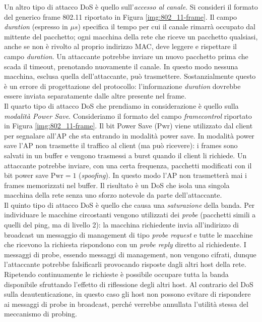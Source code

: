 Un altro tipo di attacco DoS è quello sull'\textit{accesso al canale}. Si consideri il formato del generico frame 802.11 riportato in Figura \ref{img:802_11-frame}. Il campo \textit{duration} (espresso in $\mu s$) specifica il tempo per cui il canale rimarrà occupato dal mittente del pacchetto; ogni macchina della rete che riceve un pacchetto qualsiasi, anche se non è rivolto al proprio indirizzo MAC, deve leggere e rispettare il campo \textit{duration}. Un attaccante potrebbe inviare un nuovo pacchetto prima che scada il timeout, prenotando nuovamente il canale. In questo modo nessuna macchina, esclusa quella dell'attaccante, può trasmettere. Sostanzialmente questo è un errore di progettazione del protocollo: l'informazione \textit{duration} dovrebbe essere inviata separatamente dalle altre presente nel frame.\\
Il quarto tipo di attacco DoS che prendiamo in considerazione è quello sulla \textit{modalità Power Save}. Consideriamo il formato del campo \textit{framecontrol} riportato in Figura \ref{img:802_11-frame}. Il bit Power Save (Pwr) viene utilizzato dal client per segnalare all'AP che sta entrando in modalità power save. In modalità power save l'AP non trasmette il traffico al client (ma può ricevere): i frames sono salvati in un buffer e vengono trasmessi a burst quando il client li richiede. Un attaccante potrebbe inviare, con una certa frequenza, pacchetti modificati con il bit power save $\text{Pwr} = 1$ (\textit{spoofing}). In questo modo l'AP non trasmetterà mai i frames memorizzati nel buffer. Il risultato è un DoS che isola una singola macchina della rete senza uno sforzo notevole da parte dell'attaccante.\\
Il quinto tipo di attacco DoS è quello che causa una \textit{saturazione} della banda. Per individuare le macchine circostanti vengono utilizzati dei \textit{probe} (pacchetti simili a quelli del ping, ma di livello 2): la macchina richiedente invia all'indirizzo di broadcast un messaggio di management di tipo \textit{probe request} e tutte le macchine che ricevono la richiesta rispondono con un \textit{probe reply} diretto al richiedente. I messaggi di probe, essendo messaggi di management, non vengono cifrati, dunque l'attaccante potrebbe falsificarli provocando risposte dagli altri host della rete. Ripetendo continuamente le richieste è possibile occupare tutta la banda disponibile sfruttando l'effetto di riflessione degli altri host. Al contrario del DoS sulla deautenticazione, in questo caso gli host non possono evitare di rispondere ai messaggi di probe in broadcast, perché verrebbe annullata l'utilità stessa del meccanismo di probing.\\
